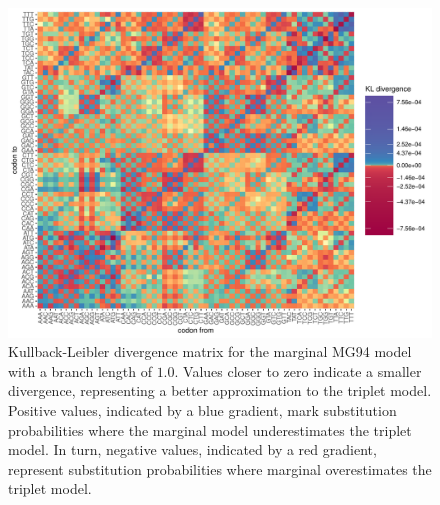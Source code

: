 \begin{figure}[!ht]
    \centering
    \includegraphics[width = \textwidth]{chapter3/figures/heatmaps/tri-sum-mg-1.pdf}
    \caption[Marginal-mg Kullback-Leibler Divergence Matrix]{Kullback-Leibler divergence matrix for the marginal MG94 model with a branch length of $1.0$. Values closer to zero indicate a smaller divergence, representing a better approximation to the triplet model. Positive values, indicated by a blue gradient, mark substitution probabilities where the marginal model underestimates the triplet model. In turn, negative values, indicated by a red gradient, represent substitution probabilities where marginal overestimates the triplet model.}
    \label{fig:kld-sum-mg}
\end{figure}



